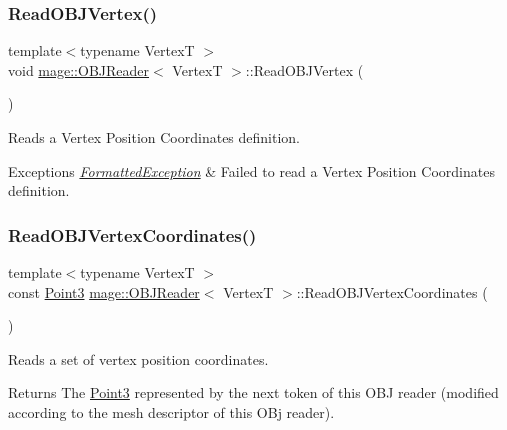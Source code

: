 \subsubsection{\texorpdfstring{Read\+O\+B\+J\+Vertex()}{ReadOBJVertex()}}
{\footnotesize\ttfamily template$<$typename VertexT $>$ \\
void \hyperlink{classmage_1_1_o_b_j_reader}{mage\+::\+O\+B\+J\+Reader}$<$ VertexT $>$\+::Read\+O\+B\+J\+Vertex (\begin{DoxyParamCaption}{ }\end{DoxyParamCaption})\hspace{0.3cm}{\ttfamily [private]}}

Reads a Vertex Position Coordinates definition.


\begin{DoxyExceptions}{Exceptions}
{\em \hyperlink{structmage_1_1_formatted_exception}{Formatted\+Exception}} & Failed to read a Vertex Position Coordinates definition. \\
\hline
\end{DoxyExceptions}
\hypertarget{classmage_1_1_o_b_j_reader_ace593a436953e8583b5b4cd721893c44}{}\label{classmage_1_1_o_b_j_reader_ace593a436953e8583b5b4cd721893c44} 
\subsubsection{\texorpdfstring{Read\+O\+B\+J\+Vertex\+Coordinates()}{ReadOBJVertexCoordinates()}}
{\footnotesize\ttfamily template$<$typename VertexT $>$ \\
const \hyperlink{structmage_1_1_point3}{Point3} \hyperlink{classmage_1_1_o_b_j_reader}{mage\+::\+O\+B\+J\+Reader}$<$ VertexT $>$\+::Read\+O\+B\+J\+Vertex\+Coordinates (\begin{DoxyParamCaption}{ }\end{DoxyParamCaption})\hspace{0.3cm}{\ttfamily [private]}}

Reads a set of vertex position coordinates.

\begin{DoxyReturn}{Returns}
The {\ttfamily \hyperlink{structmage_1_1_point3}{Point3}} represented by the next token of this O\+BJ reader (modified according to the mesh descriptor of this O\+Bj reader). 
\end{DoxyReturn}

